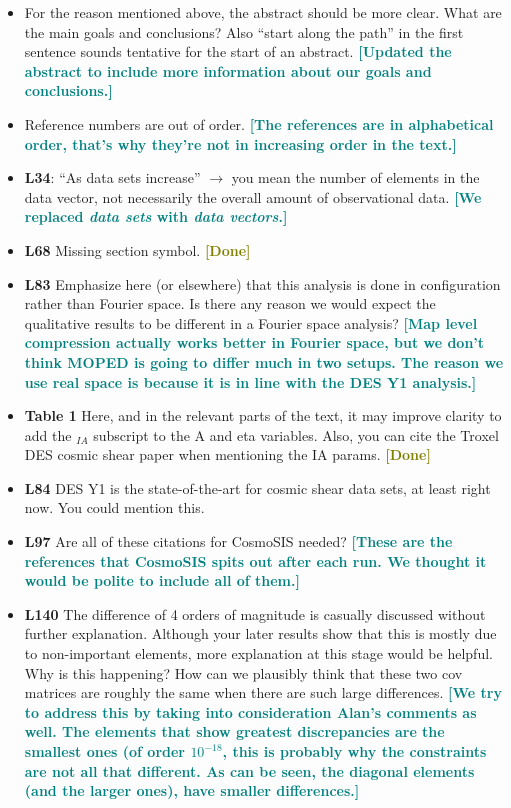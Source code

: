 \documentclass{article}
\newcommand\reply[1]{{\bf {\textcolor{teal}{[#1]}}}}
\newcommand\done{{\bf {\textcolor{olive}{[Done]}}}}
\begin{document}
	\begin{itemize}
	\item For the reason mentioned above, the abstract should be more clear. What are the main goals and conclusions? Also “start along the path” in the first sentence sounds tentative for the start of an abstract. \reply{Updated the abstract to include more information about our goals and conclusions.}
	\item Reference numbers are out of order. \reply{The references are in alphabetical order, that's why they're not in increasing order in the text.}
	\item \textbf{L34}: “As data sets increase” $\rightarrow$ you mean the number of elements in the data vector, not necessarily the overall amount of observational data. \reply{We replaced \textit{data sets} with \textit{data vectors}.}
	\item \textbf{L68} Missing section symbol. \done
	\item \textbf{L83} Emphasize here (or elsewhere) that this analysis is done in configuration rather than Fourier space. Is there any reason we would expect the qualitative results to be different in a Fourier space analysis? \reply{Map level compression actually works better in Fourier space, but we don't think MOPED is going to differ much in two setups. The reason we use real space is because it is in line with the DES Y1 analysis.}
	\item \textbf{Table 1} Here, and in the relevant parts of the text, it may improve clarity to add the $_{IA}$ subscript to the A and eta variables. Also, you can cite the Troxel DES cosmic shear paper when mentioning the IA params. \done
	\item \textbf{L84} DES Y1 is the state-of-the-art for cosmic shear data sets, at least right now. You could mention this.
	\item \textbf{L97} Are all of these citations for CosmoSIS needed? \reply{These are the references that CosmoSIS spits out after each run. We thought it would be polite to include all of them.}
	\item \textbf{L140} The difference of 4 orders of magnitude is casually discussed without further explanation. Although your later results show that this is mostly due to non-important elements, more explanation at this stage would be helpful. Why is this happening? How can we plausibly think that these two cov matrices are roughly the same when there are such large differences. \reply{We try to address this by taking into consideration Alan's comments as well. The elements that show greatest discrepancies are the smallest ones (of order $10^{-18}$, this is probably why the constraints are not all that different. As can be seen, the diagonal elements (and the larger ones), have smaller differences.}

\end{itemize}
\end{document}
